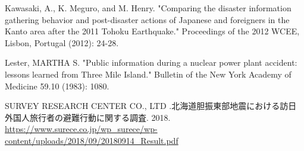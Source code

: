 \documentclass[letterpaper,12pt,titlepage,oneside,final,a4j,dvipdfmx]{book}
\begin{document}
\begin{thebibliography}{60}
 Kawasaki, A., K. Meguro, and M. Henry. "Comparing the disaster information gathering behavior and post-disaster actions of Japanese and foreigners in the Kanto area after the 2011 Tohoku Earthquake." Proceedings of the 2012 WCEE, Lisbon, Portugal (2012): 24-28.

 Lester, MARTHA S. "Public information during a nuclear power plant accident: lessons learned from Three Mile Island." Bulletin of the New York Academy of Medicine 59.10 (1983): 1080.


 SURVEY RESEARCH CENTER CO., LTD .北海道胆振東部地震における訪日外国人旅行者の避難行動に関する調査. 2018. \url{https://www.surece.co.jp/wp_surece/wp-content/uploads/2018/09/20180914_Result.pdf}
\end{thebibliography}



\end{document}
